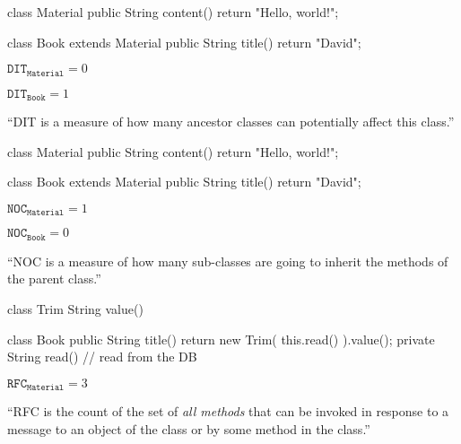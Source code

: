 \documentclass{article}
\begin{document}
\begin{multicols}{2}
{\small\begin{ffcode}
class Material {
  public String content() {
    return "Hello, world!";
  }
}

class Book extends Material {
  public String title() {
    return "David";
  }
}
\end{ffcode}
}
\par\columnbreak\par
\(\texttt{DIT}_\texttt{Material} = 0\)\par
\(\texttt{DIT}_\texttt{Book} = 1\)\par
``DIT is a measure of how many ancestor classes can potentially affect this class.''
\end{multicols}
\plush{}

\begin{multicols}{2}
{\small\begin{ffcode}
class Material {
  public String content() {
    return "Hello, world!";
  }
}

class Book extends Material {
  public String title() {
    return "David";
  }
}
\end{ffcode}
}
\par\columnbreak\par
\(\texttt{NOC}_\texttt{Material} = 1\)\par
\(\texttt{NOC}_\texttt{Book} = 0\)\par
``NOC is a measure of how many sub-classes are going to inherit the methods of the parent class.''
\end{multicols}
\plush{}

\begin{multicols}{2}
{\small\begin{ffcode}
class Trim
  String value()

class Book
  public String title()
    return new Trim(
      this.read()
    ).value();
  private String read()
    // read from the DB
\end{ffcode}
}
\par\columnbreak\par
\(\texttt{RFC}_\texttt{Material} = 3\)\par
``RFC is the count of the set of \emph{all methods} that can be invoked in response to a message to an object of the class or by some method in the class.''
\end{multicols}
\plush{}
\end{document}
